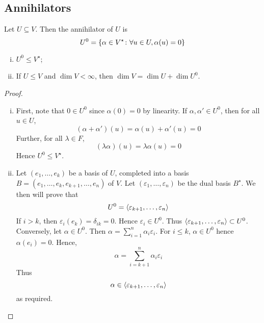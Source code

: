 \subsection{Annihilators}
\begin{definition}
	Let \( U \subseteq V \).
	Then the annihilator of \( U \) is
	\[
		U^0 = \qty{\alpha \in V^\star \colon \forall u \in U, \alpha(u) = 0}
	\]
\end{definition}
\begin{lemma}
	\begin{enumerate}[(i)]
		\item \( U^0 \leq V^\star \);
		\item If \( U \leq V \) and \( \dim V < \infty \), then \( \dim V = \dim U + \dim U^0 \).
	\end{enumerate}
\end{lemma}
\begin{proof}
	\begin{enumerate}[(i)]
		\item First, note that \( 0 \in U^0 \) since \( \alpha(0) = 0 \) by linearity.
		      If \( \alpha, \alpha' \in U^0 \), then for all \( u \in U \),
		      \[
			      (\alpha + \alpha')(u) = \alpha(u) + \alpha'(u) = 0
		      \]
		      Further, for all \( \lambda \in F \),
		      \[
			      (\lambda \alpha)(u) = \lambda \alpha(u) = 0
		      \]
		      Hence \( U^0 \leq V^\star \).
		\item Let \( (e_1, \dots, e_k) \) be a basis of \( U \), completed into a basis \( B = (e_1, \dots, e_k, e_{k+1}, \dots, e_n) \) of \( V \).
		      Let \( (\varepsilon_1, \dots, \varepsilon_n) \) be the dual basis \( B^\star \).
		      We then will prove that
		      \[
			      U^0 = \langle{} \varepsilon_{k+1}, \dots, \varepsilon_n \rangle
		      \]
		      If \( i > k \), then \( \varepsilon_i(e_k) = \delta_{ik} = 0 \).
		      Hence \( \varepsilon_i \in U^0 \).
		      Thus \( \langle{} \varepsilon_{k+1}, \dots, \varepsilon_n \rangle \subset U^0 \).
		      Conversely, let \( \alpha \in U^0 \).
		      Then \( \alpha = \sum_{i=1}^n \alpha_i \varepsilon_i \).
		      For \( i \leq k \), \( \alpha \in U^0 \) hence \( \alpha(e_i) = 0 \).
		      Hence,
		      \[
			      \alpha = \sum_{i=k+1}^n \alpha_i \varepsilon_i
		      \]
		      Thus
		      \[
			      \alpha \in \langle{} \varepsilon_{k+1}, \dots, \varepsilon_n \rangle
		      \]
		      as required.
	\end{enumerate}
\end{proof}

